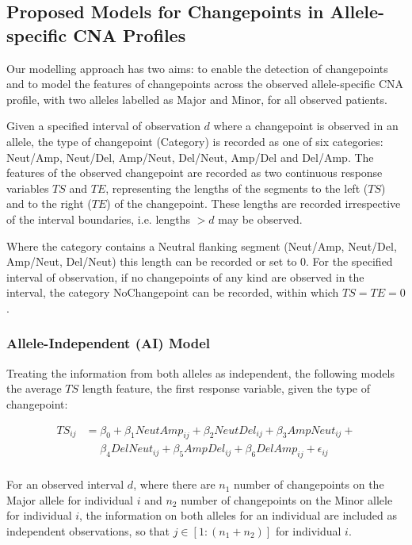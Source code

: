 \subsection{Proposed Models for Changepoints in Allele-specific CNA Profiles} \label{models}
Our modelling approach has two aims: to enable the detection of changepoints and to model the features of changepoints across the observed allele-specific CNA profile, with two alleles labelled as Major and Minor, for all observed patients. 

Given a specified interval of observation $d$ where a changepoint is observed in an allele, the type of changepoint (Category) is recorded as one of six categories: Neut/Amp, Neut/Del, Amp/Neut, Del/Neut, Amp/Del and Del/Amp. The features of the observed changepoint are recorded as two continuous response variables $TS$ and $TE$, representing the lengths of the segments to the left ($TS$) and to the right ($TE$) of the changepoint. These lengths are recorded irrespective of the interval boundaries, i.e. lengths $>d$ may be observed. 

Where the category contains a Neutral flanking segment (Neut/Amp, Neut/Del, Amp/Neut, Del/Neut) this length can be recorded or set to 0. For the specified interval of observation, if no changepoints of any kind are observed in the interval, the category NoChangepoint can be recorded, within which $TS=TE=0$.

\subsubsection{Allele-Independent (AI) Model} \label{Model1}
Treating the information from both alleles as independent, the following models the average $TS$ length feature, the first response variable, given the type of changepoint: 

\begin{equation}
\begin{aligned}
TS_{ij}&=\beta_0+ \beta_1 NeutAmp_{ij} + \beta_2NeutDel_{ij}+ \beta_3AmpNeut_{ij} +  \\
       & \mathrel{\phantom{=}} \beta_4DelNeut_{ij}+ \beta_5AmpDel_{ij} + \beta_6DelAmp_{ij} + \epsilon_{ij}\\
\end{aligned}
\label{Eq1}
\end{equation}

For an observed interval $d$, where there are $n_1$ number of changepoints on the Major allele for individual $i$ and $n_2$ number of changepoints on the Minor allele for individual $i$, the information on both alleles for an individual are included as independent observations, so that $j\in [1: (n_1+n_2)]$ for individual $i$.

